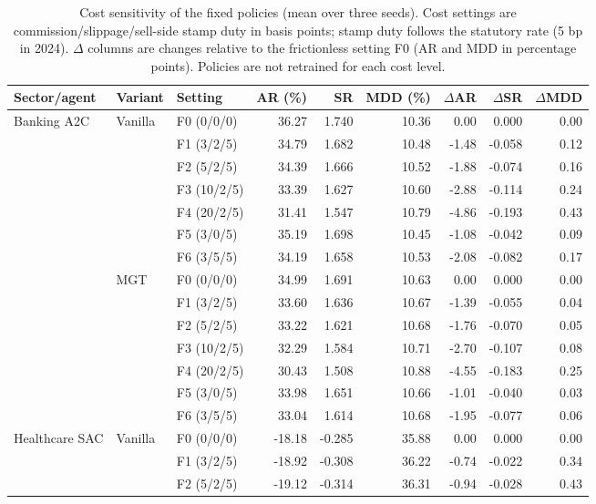 \begin{table}[!t]\centering\small\color{blue}
\caption{Cost sensitivity of the fixed policies (mean over three seeds). Cost settings are commission/slippage/sell-side stamp duty in basis points; stamp duty follows the statutory rate (5 bp in 2024). $\Delta$ columns are changes relative to the frictionless setting F0 (AR and MDD in percentage points). Policies are not retrained for each cost level.}
\label{tab:cost}
\begin{tabular}{lllrrrrrr}\toprule
Sector/agent & Variant & Setting & AR (\%) & SR & MDD (\%) & $\Delta$AR & $\Delta$SR & $\Delta$MDD \\ \midrule
Banking A2C & Vanilla & F0 (0/0/0) & 36.27 & 1.740 & 10.36 & 0.00 & 0.000 & 0.00 \\
 &  & F1 (3/2/5) & 34.79 & 1.682 & 10.48 & -1.48 & -0.058 & 0.12 \\
 &  & F2 (5/2/5) & 34.39 & 1.666 & 10.52 & -1.88 & -0.074 & 0.16 \\
 &  & F3 (10/2/5) & 33.39 & 1.627 & 10.60 & -2.88 & -0.114 & 0.24 \\
 &  & F4 (20/2/5) & 31.41 & 1.547 & 10.79 & -4.86 & -0.193 & 0.43 \\
 &  & F5 (3/0/5) & 35.19 & 1.698 & 10.45 & -1.08 & -0.042 & 0.09 \\
 &  & F6 (3/5/5) & 34.19 & 1.658 & 10.53 & -2.08 & -0.082 & 0.17 \\
\addlinespace
 & MGT & F0 (0/0/0) & 34.99 & 1.691 & 10.63 & 0.00 & 0.000 & 0.00 \\
 &  & F1 (3/2/5) & 33.60 & 1.636 & 10.67 & -1.39 & -0.055 & 0.04 \\
 &  & F2 (5/2/5) & 33.22 & 1.621 & 10.68 & -1.76 & -0.070 & 0.05 \\
 &  & F3 (10/2/5) & 32.29 & 1.584 & 10.71 & -2.70 & -0.107 & 0.08 \\
 &  & F4 (20/2/5) & 30.43 & 1.508 & 10.88 & -4.55 & -0.183 & 0.25 \\
 &  & F5 (3/0/5) & 33.98 & 1.651 & 10.66 & -1.01 & -0.040 & 0.03 \\
 &  & F6 (3/5/5) & 33.04 & 1.614 & 10.68 & -1.95 & -0.077 & 0.06 \\
\addlinespace
\midrule
Healthcare SAC & Vanilla & F0 (0/0/0) & -18.18 & -0.285 & 35.88 & 0.00 & 0.000 & 0.00 \\
 &  & F1 (3/2/5) & -18.92 & -0.308 & 36.22 & -0.74 & -0.022 & 0.34 \\
 &  & F2 (5/2/5) & -19.12 & -0.314 & 36.31 & -0.94 & -0.028 & 0.43 \\

\end{tabular}
\end{table}
